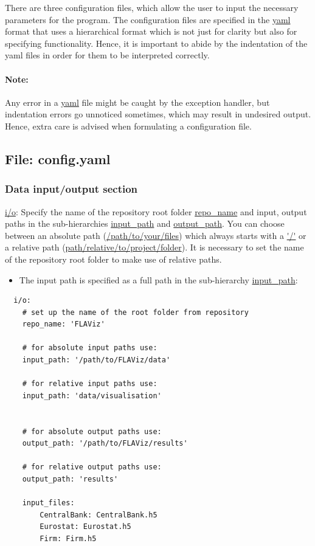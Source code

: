 \documentclass[10pt,a4paper]{article}
\begin{document}
There are three configuration files, which allow the user to input the necessary parameters for the program. The configuration files are specified in the \url{yaml} format that uses a hierarchical format which is not just for clarity but also for specifying functionality. Hence, it is important to abide by the indentation of the yaml files in order for them to be interpreted correctly. 

\paragraph{Note:} Any error in a \url{yaml} file might be caught by the exception handler, but indentation errors go unnoticed sometimes, which may result in undesired output. Hence, extra care is advised when formulating a configuration file.

\subsection{File: config.yaml}

\subsubsection*{Data input/output section}

\url{i/o}: Specify the name of the repository root folder \url{repo_name} and input, output paths in the sub-hierarchies \url{input_path} and \url{output_path}. You can choose between an absolute path (\url{/path/to/your/files}) which always starts with a \url{'/'} or a relative path (\url{path/relative/to/project/folder}). It is necessary to set the name of the repository root folder to make use of relative paths.

\begin{itemize}
    \item The input path is specified as a full path in the sub-hierarchy \url{input_path}:
\end{itemize}

\lstset{language=C,frame=single, basicstyle=\footnotesize}
\begin{lstlisting}
  i/o:
    # set up the name of the root folder from repository    
    repo_name: 'FLAViz'

    # for absolute input paths use:
    input_path: '/path/to/FLAViz/data'

    # for relative input paths use:
    input_path: 'data/visualisation'


    # for absolute output paths use:
    output_path: '/path/to/FLAViz/results'

    # for relative output paths use:
    output_path: 'results'
    
    input_files:
        CentralBank: CentralBank.h5
        Eurostat: Eurostat.h5
        Firm: Firm.h5
\end{lstlisting}
\end{document}
